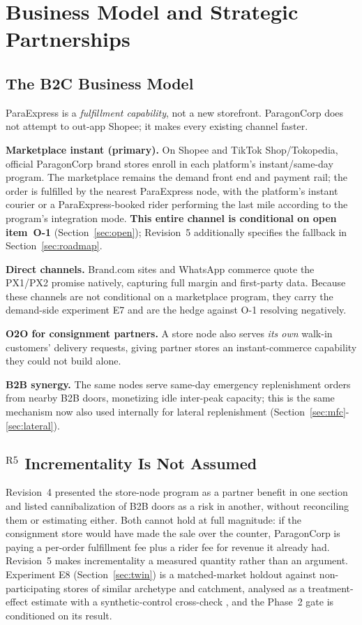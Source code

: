 \section{Business Model and Strategic Partnerships}\label{sec:business}

\subsection{The B2C Business Model}
ParaExpress is a \emph{fulfillment capability}, not a new storefront. ParagonCorp does not attempt to out-app Shopee; it makes every existing channel faster.

\textbf{Marketplace instant (primary).} On Shopee and TikTok Shop/Tokopedia, official ParagonCorp brand stores enroll in each platform's instant/same-day program. The marketplace remains the demand front end and payment rail; the order is fulfilled by the nearest ParaExpress node, with the platform's instant courier or a ParaExpress-booked rider performing the last mile according to the program's integration mode. \textbf{This entire channel is conditional on open item~O-1} (Section~\ref{sec:open}); Revision~5 additionally specifies the fallback in Section~\ref{sec:roadmap}.

\textbf{Direct channels.} Brand.com sites and WhatsApp commerce quote the PX1/PX2 promise natively, capturing full margin and first-party data. Because these channels are not conditional on a marketplace program, they carry the demand-side experiment E7 and are the hedge against O-1 resolving negatively.

\textbf{O2O for consignment partners.} A store node also serves \emph{its own} walk-in customers' delivery requests, giving partner stores an instant-commerce capability they could not build alone.

\textbf{B2B synergy.} The same nodes serve same-day emergency replenishment orders from nearby B2B doors, monetizing idle inter-peak capacity; this is the same mechanism now also used internally for lateral replenishment (Section~\ref{sec:mfc}-\ref{sec:lateral}).

\subsection{$^{\mathrm{R5}}$ Incrementality Is Not Assumed}
Revision~4 presented the store-node program as a partner benefit in one section and listed cannibalization of B2B doors as a risk in another, without reconciling them or estimating either. Both cannot hold at full magnitude: if the consignment store would have made the sale over the counter, ParagonCorp is paying a per-order fulfillment fee plus a rider fee for revenue it already had. Revision~5 makes incrementality a measured quantity rather than an argument. Experiment E8 (Section~\ref{sec:twin}) is a matched-market holdout against non-participating stores of similar archetype and catchment, analysed as a treatment-effect estimate \cite{imbens2015} with a synthetic-control cross-check \cite{abadie2010}, and the Phase~2 gate is conditioned on its result.

